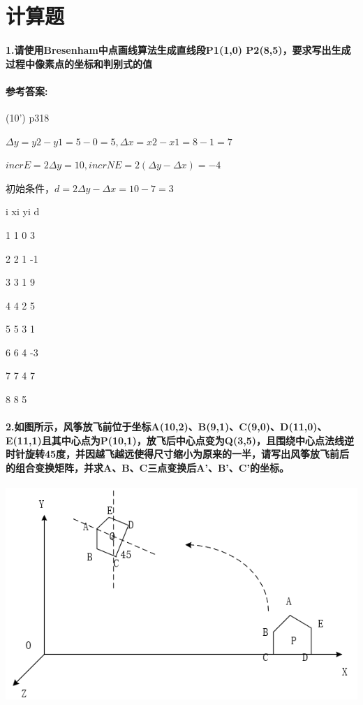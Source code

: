 \documentclass[12pt,a4paper,UTF8]{ctexart}
\begin{document}
	\section{计算题}
	\paragraph{1.请使用Bresenham中点画线算法生成直线段P1(1,0) P2(8,5)，要求写出生成过程中像素点的坐标和判别式的值}
	\paragraph{参考答案:}(10') p318
	\par $\Delta y=y2-y1=5-0=5, \Delta x=x2-x1=8-1=7$
	\par $incrE=2\Delta y=10,incrNE=2(\Delta y-\Delta x)=-4$
	\par 初始条件，$d=2\Delta y-\Delta x=10-7=3$
	\par i xi yi d
	\par 1 1 0 3
	\par 2 2 1 -1
	\par 3 3 1 9
	\par 4 4 2 5
	\par 5 5 3 1
	\par 6 6 4 -3
	\par 7 7 4 7
	\par 8 8 5
	
	\paragraph{2.如图所示，风筝放飞前位于坐标A(10,2)、B(9,1)、C(9,0)、D(11,0)、E(11,1)且其中心点为P(10,1)，放飞后中心点变为Q(3,5)，且围绕中心点法线逆时针旋转45度，并因越飞越远使得尺寸缩小为原来的一半，请写出风筝放飞前后的组合变换矩阵，并求A、B、C三点变换后A'、B'、C'的坐标。}
	\begin{center}
		\includegraphics[scale=1.0]{zuobiao.png}
	\end{center}
\end{document}
